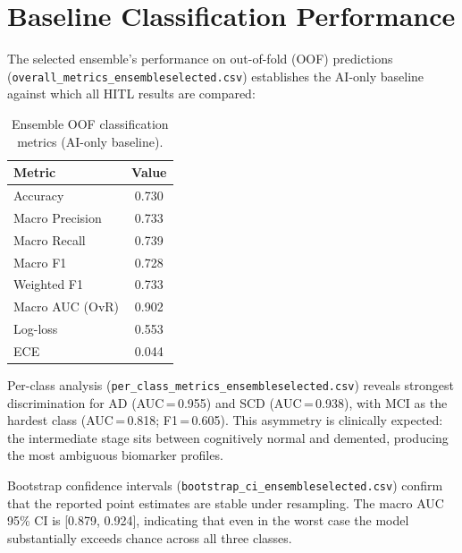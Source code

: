 \documentclass[12pt, a4paper]{report}
\begin{document}
  \section{Baseline Classification Performance}
  \label{sec:baseline-performance}

  The selected ensemble's performance on out-of-fold (OOF) predictions
  (\texttt{overall\_metrics\_ensembleselected.csv}) establishes the AI-only baseline
  against which all HITL results are compared:

  \begin{table}[htbp]
    \centering
    \caption{Ensemble OOF classification metrics (AI-only baseline).}
    \label{tab:baseline}
    \begin{tabular}{lS[table-format=1.3]}
      \toprule
      {Metric} & {Value} \\
      \midrule
      Accuracy            & 0.730 \\
      Macro Precision     & 0.733 \\
      Macro Recall        & 0.739 \\
      Macro F1            & 0.728 \\
      Weighted F1         & 0.733 \\
      Macro AUC (OvR)     & 0.902 \\
      Log-loss            & 0.553 \\
      ECE                 & 0.044 \\
      \bottomrule
    \end{tabular}
  \end{table}

  Per-class analysis (\texttt{per\_class\_metrics\_ensembleselected.csv}) reveals
  strongest discrimination for AD (AUC\,=\,0.955) and SCD (AUC\,=\,0.938), with
  MCI as the hardest class (AUC\,=\,0.818; F1\,=\,0.605).  This asymmetry is
  clinically expected: the intermediate stage sits between cognitively normal and
  demented, producing the most ambiguous biomarker profiles.

  Bootstrap confidence intervals (\texttt{bootstrap\_ci\_ensembleselected.csv})
  confirm that the reported point estimates are stable under resampling.  The macro
  AUC 95\% CI is [0.879, 0.924], indicating that even in the worst case the model
  substantially exceeds chance across all three classes.

\end{document}
